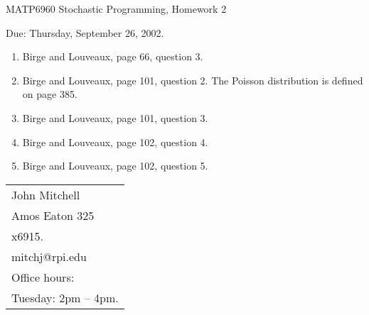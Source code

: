 \documentclass[12pt]{article}
\begin{document}
\begin{center}
  \begin{large}
     MATP6960 Stochastic Programming, Homework 2
  \end{large}
\end{center}

\begin{flushright}
   Due:  Thursday, September 26, 2002.
\end{flushright}

\vspace{\baselineskip}


\begin{enumerate}
\item Birge and Louveaux, page 66, question 3.
\item Birge and Louveaux, page 101, question 2.
The Poisson distribution is defined on page 385.
\item Birge and Louveaux, page 101, question 3.
\item Birge and Louveaux, page 102, question 4.
\item Birge and Louveaux, page 102, question 5.
\end{enumerate}

\vfill

\begin{tabular}{@{\hspace{.5in}}l}
   John Mitchell  \\
   Amos Eaton 325  \\
   x6915.  \\
   mitchj@rpi.edu  \\
   Office hours:  \\
   Tuesday: 2pm -- 4pm.
\end{tabular}
\end{document}
